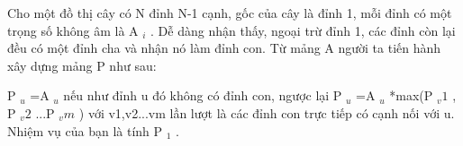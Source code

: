 Cho một đồ thị cây có N đỉnh N-1 cạnh, gốc của cây là đỉnh 1, mỗi đỉnh có một trọng số không âm là A   $_    i   $   . Dễ dàng nhận thấy, ngoại trừ đỉnh 1, các đỉnh còn lại đều có một đỉnh cha và nhận nó làm đỉnh con. Từ mảng A người ta tiến hành xây dựng mảng P như sau:  

   P   $_    u   $   =A   $_    u   $   nếu như đỉnh u đó không có đỉnh con, ngược lại P   $_    u   $   =A   $_    u   $   *max(P   $_    v1   $   , P   $_    v2   $   ...P   $_    vm   $   ) với v1,v2...vm lần lượt là các đỉnh con trực tiếp có cạnh nối với u. Nhiệm vụ của bạn là tính P   $_    1   $   .